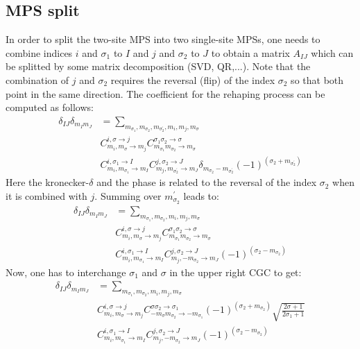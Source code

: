 \documentclass[a4paper,10pt,parskip=full]{scrartcl}
\begin{document}
\subsection{MPS split}
In order to split the two-site MPS into two single-site MPSs, one
needs to combine indices $i$ and $\sigma_1$ to $I$ and $j$ and $\sigma_2$ to $J$
to obtain a matrix $A_{IJ}$ which can be splitted by some matrix
decomposition (SVD, QR,...). Note that the combination of $j$ and
$\sigma_2$ requires the reversal (flip) of the index $\sigma_2$ so that both
point in the same direction. The coefficient for the rehaping process
can be computed as follows:
\begin{equation}
  \begin{split}
    \delta_{IJ}\delta_{m_Im_J}&=
    \sum_{m_{\sigma_1},m_{\sigma_2}, m_{\sigma_2^\prime},m_{i},m_j,m_{\sigma}}\\
    &C^{i,\sigma\rightarrow j}_{m_{i},m_{\sigma}\rightarrow m_{j}}
    C^{\sigma_1\sigma_2\rightarrow\sigma}_{m_{\sigma_1}m_{\sigma_2}\rightarrow m_{\sigma}}\\
    &C^{i,\sigma_1\rightarrow I}_{m_i,m_{\sigma_1}\rightarrow m_{I}}
    C^{j,\sigma_2\rightarrow J}_{m_j,m_{\sigma_2^\prime}\rightarrow m_{J}}\delta_{m_{\sigma_2}-m_{\sigma_2^\prime}}(-1)^{(\sigma_2+m_{\sigma_2^\prime})}
  \end{split}
\end{equation}
Here the kronecker-$\delta$ and the phase is related to the reversal
of the index $\sigma_2$ when it is combined with $j$.
Summing over $m_{\sigma_2}^\prime$ leads to:
\begin{equation}
  \begin{split}
    \delta_{IJ}\delta_{m_Im_J}&=
    \sum_{m_{\sigma_1},m_{\sigma_2},m_{i},m_j,m_{\sigma}}\\
    &C^{i,\sigma\rightarrow j}_{m_{i},m_{\sigma}\rightarrow m_{j}}
    C^{\sigma_1\sigma_2\rightarrow\sigma}_{m_{\sigma_1}m_{\sigma_2}\rightarrow m_{\sigma}}\\
    &C^{i,\sigma_1\rightarrow I}_{m_i,m_{\sigma_1}\rightarrow m_{I}}
    C^{j,\sigma_2\rightarrow J}_{m_j,-m_{\sigma_2}\rightarrow m_{J}}(-1)^{(\sigma_2-m_{\sigma_2})}
  \end{split}
\end{equation}
Now, one has to interchange $\sigma_1$ and $\sigma$ in the upper right
CGC to get:
\begin{equation}
  \begin{split}
    \delta_{IJ}\delta_{m_Im_J}&=
    \sum_{m_{\sigma_1},m_{\sigma_2},m_{i},m_j,m_{\sigma}}\\
    &C^{i,\sigma\rightarrow j}_{m_{i},m_{\sigma}\rightarrow m_{j}}
    C^{\sigma\sigma_2\rightarrow\sigma_1}_{-m_{\sigma}m_{\sigma_2}\rightarrow -m_{\sigma_1}}(-1)^{(\sigma_2+m_{\sigma_2})}\sqrt{\frac{2\sigma+1}{2\sigma_1+1}}\\
    &C^{i,\sigma_1\rightarrow I}_{m_i,m_{\sigma_1}\rightarrow m_{I}}
    C^{j,\sigma_2\rightarrow J}_{m_j,-m_{\sigma_2}\rightarrow m_{J}}(-1)^{(\sigma_2-m_{\sigma_2})}
  \end{split}
\end{equation}
\end{document}
